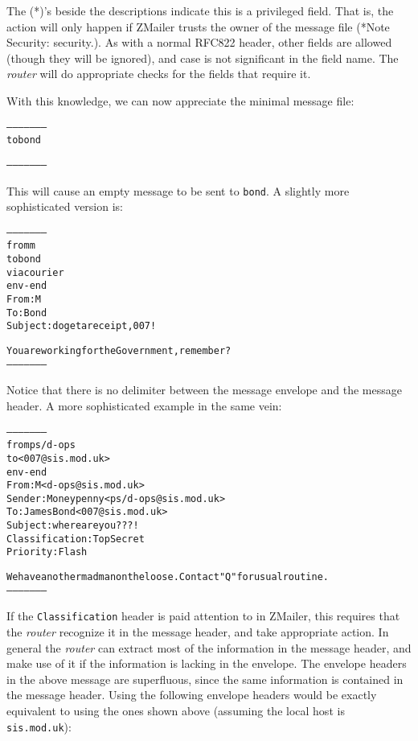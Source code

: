 The (*)'s beside the descriptions indicate this is a privileged field.
That is, the action will only happen if ZMailer trusts the owner of the
message file (*Note Security: security.).  As with a normal RFC822 header,
other fields are allowed (though they will be ignored), and case is not
significant in the field name.  The {\em router} will do appropriate checks for
the fields that require it.

With this knowledge, we can now appreciate the minimal message file:

\begin{alltt}
     --------------------
     to bond
     
     --------------------
\end{alltt}


This will cause an empty message to be sent to {\tt bond}.  A slightly more
sophisticated version is:

\begin{alltt}
     --------------------
     from m
     to bond
     via courier
     env-end
     From: M
     To: Bond
     Subject: do get a receipt, 007!
     
     You are working for the Government, remember?
     --------------------
\end{alltt}


Notice that there is no delimiter between the message envelope and the
message header.  A more sophisticated example in the same vein:

\begin{alltt}
     --------------------
     from ps/d-ops
     to <007@sis.mod.uk>
     env-end
     From: M <d-ops@sis.mod.uk>
     Sender: Moneypenny <ps/d-ops@sis.mod.uk>
     To: James Bond <007@sis.mod.uk>
     Subject: where are you???!
     Classification: Top Secret
     Priority: Flash
     
     We have another madman on the loose.  Contact "Q" for usual routine.
     --------------------
\end{alltt}


If the {\tt Classification} header is paid attention to in ZMailer, this
requires that the {\em router} recognize it in the message header, and take
appropriate action.  In general the {\em router} can extract most of the
information in the message header, and make use of it if the information is
lacking in the envelope.  The envelope headers in the above message are
superfluous, since the same information is contained in the message header.
Using the following envelope headers would be exactly equivalent to using
the ones shown above (assuming the local host is {\tt sis.mod.uk}):


